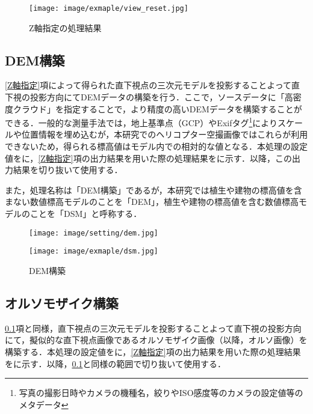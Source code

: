       \begin{figure}[t]
        \centering
        \texttt{[image: image/exmaple/view\_reset.jpg]}
        \caption{Z軸指定の処理結果}
        \label{Z軸指定結果}
      \end{figure}


    \subsection{DEM構築}
      \label{DEM構築}
      \ref{Z軸指定}項によって得られた直下視点の三次元モデルを投影することよって直下視の投影方向にてDEMデータの構築を行う．ここで，ソースデータに「高密度クラウド」を指定することで，より精度の高いDEMデータを構築することができる．一般的な測量手法では，地上基準点（GCP）やExifタグ\footnote{写真の撮影日時やカメラの機種名，絞りやISO感度等のカメラの設定値等のメタデータ}によりスケールや位置情報を埋め込むが，本研究でのヘリコプター空撮画像ではこれらが利用できないため，得られる標高値はモデル内での相対的な値となる．本処理の設定値をに，\ref{Z軸指定}項の出力結果を用いた際の処理結果をに示す．以降，この出力結果を切り抜いて使用する．

      また，処理名称は「DEM構築」であるが，本研究では植生や建物の標高値を含まない数値標高モデルのことを「DEM」，植生や建物の標高値を含む数値標高モデルのことを「DSM」と呼称する．

      \begin{figure}[t]
        \begin{minipage}[c]{0.45\hsize}
          \centering
          \texttt{[image: image/setting/dem.jpg]}
          \label{DEM構築設定値}
        \end{minipage}
        \begin{minipage}[c]{0.45\hsize}
          \centering
          \texttt{[image: image/exmaple/dsm.jpg]}
          \label{DEM構築結果}
        \end{minipage}
        \caption{DEM構築}
      \end{figure}


    \subsection{オルソモザイク構築}
      \label{オルソモザイク構築}
      \ref{DEM構築}項と同様，直下視点の三次元モデルを投影することよって直下視の投影方向にて，擬似的な直下視点画像であるオルソモザイク画像（以降，オルソ画像）を構築する．本処理の設定値をに，\ref{Z軸指定}項の出力結果を用いた際の処理結果をに示す．以降，\ref{DEM構築}と同様の範囲で切り抜いて使用する．

